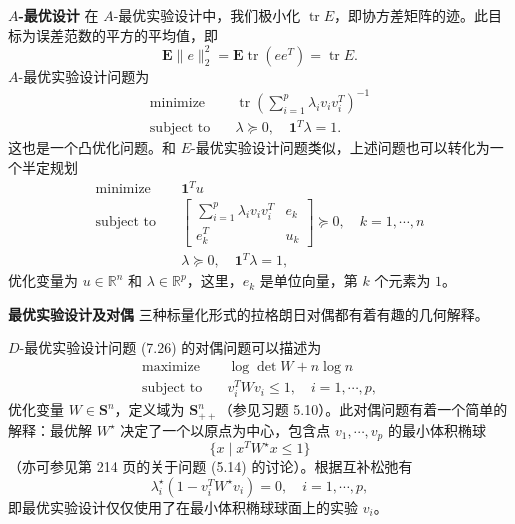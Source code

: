 \documentclass[UTF8,12pt,a4paper,fontset=fandol]{ctexart}
\begin{document}
\noindent\textbf{$A$-最优设计}\quad
在 $A$-最优实验设计中，我们极小化 $\operatorname{tr}E$，即协方差矩阵的迹。此目标为误差范数的平方的平均值，即
\[
\mathbf{E}\|e\|_2^2=\mathbf{E}\operatorname{tr}(ee^T)=\operatorname{tr}E.
\]
$A$-最优实验设计问题为
\begin{equation}
\begin{aligned}
\text{minimize}\quad & \operatorname{tr}\left(\sum_{i=1}^p\lambda_iv_iv_i^T\right)^{-1}\\
\text{subject to}\quad & \lambda\succeq 0,\quad \mathbf{1}^T\lambda=1.
\end{aligned}
\tag{7.28}
\end{equation}
这也是一个凸优化问题。和 $E$-最优实验设计问题类似，上述问题也可以转化为一个半定规划
\[
\begin{aligned}
\text{minimize}\quad & \mathbf{1}^Tu\\
\text{subject to}\quad &
\begin{bmatrix}
\sum_{i=1}^p\lambda_iv_iv_i^T & e_k\\
e_k^T & u_k
\end{bmatrix}\succeq 0,\quad k=1,\cdots,n\\
& \lambda\succeq 0,\quad \mathbf{1}^T\lambda=1,
\end{aligned}
\]
优化变量为 $u\in\mathbb{R}^n$ 和 $\lambda\in\mathbb{R}^p$，这里，$e_k$ 是单位向量，第 $k$ 个元素为 $1$。

\noindent\textbf{最优实验设计及对偶}\quad
三种标量化形式的拉格朗日对偶都有着有趣的几何解释。

$D$-最优实验设计问题 (7.26) 的对偶问题可以描述为
\[
\begin{aligned}
\text{maximize}\quad & \log\det W+n\log n\\
\text{subject to}\quad & v_i^TWv_i\leq 1,\quad i=1,\cdots,p,
\end{aligned}
\]
优化变量 $W\in\mathbf{S}^n$，定义域为 $\mathbf{S}_{++}^n$（参见习题 5.10）。此对偶问题有着一个简单的解释：最优解 $W^\star$ 决定了一个以原点为中心，包含点 $v_1,\cdots,v_p$ 的最小体积椭球
\[
\{x\mid x^TW^\star x\leq 1\}
\]
（亦可参见第 214 页的关于问题 (5.14) 的讨论）。根据互补松弛有
\begin{equation}
\lambda_i^\star(1-v_i^TW^\star v_i)=0,\quad i=1,\cdots,p,
\tag{7.29}
\end{equation}
即最优实验设计仅仅使用了在最小体积椭球球面上的实验 $v_i$。
\end{document}
